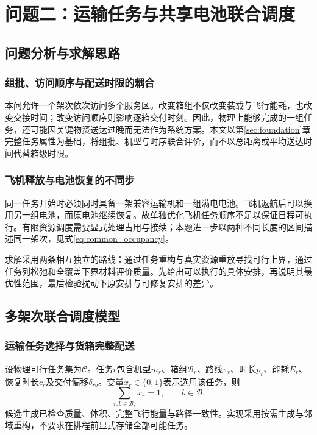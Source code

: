 \section{问题二：运输任务与共享电池联合调度}
\label{sec:q2}

\subsection{问题分析与求解思路}
\subsubsection{组批、访问顺序与配送时限的耦合}
本问允许一个架次依次访问多个服务区。改变箱组不仅改变装载与飞行能耗，也改变交接时间；改变访问顺序则影响逐箱交付时刻。因此，物理上能够完成的一组任务，还可能因关键物资送达过晚而无法作为系统方案。本文以第\ref{sec:foundation}章完整任务属性为基础，将组批、机型与时序联合评价，而不以总距离或平均送达时间代替箱级时限。

\subsubsection{飞机释放与电池恢复的不同步}
同一任务开始时必须同时具备一架兼容运输机和一组满电电池。飞机返航后可以换用另一组电池，而原电池继续恢复。故单独优化飞机任务顺序不足以保证日程可执行。有限资源调度需要显式处理占用与接续\cite{pinedo2016scheduling}；本题进一步以两种不同长度的区间描述同一架次，见式\eqref{eq:common_occupancy}。

求解采用两条相互独立的路线：通过任务重构与真实资源重放寻找可行上界，通过任务列松弛和全覆盖下界材料评价质量。先给出可以执行的具体安排，再说明其最优性范围，最后检验扰动下原安排与可修复安排的差异。

\subsection{多架次联合调度模型}
\subsubsection{运输任务选择与货箱完整配送}
设物理可行任务集为$\mathcal C$。任务$r$包含机型$m_r$、箱组$\mathcal B_r$、路线$\pi_r$、时长$p_r$、能耗$E_r$、恢复时长$c_r$及交付偏移$\delta_{rb}$。变量$x_r\in\{0,1\}$表示选用该任务，则
\begin{equation}
 \sum_{r:b\in\mathcal B_r}x_r=1,\qquad b\in\mathcal B.
\label{eq:q2_cover}
\end{equation}
候选生成已检查质量、体积、完整飞行能量与路径一致性。实现采用按需生成与邻域重构，不要求在排程前显式存储全部可能任务。

